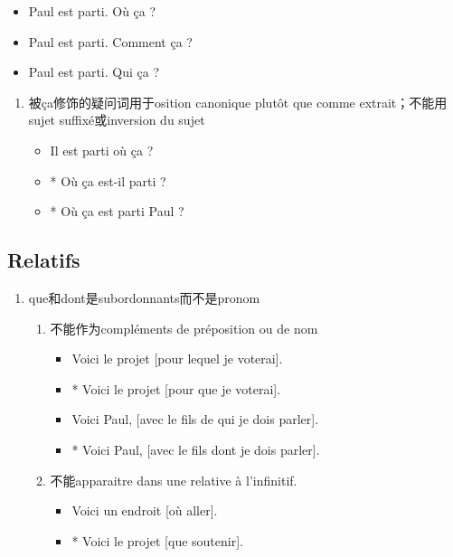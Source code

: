 \documentclass[UTF8]{report}
\begin{document}
\begin{enumerate}
    \begin{itemize}
        \item Paul est parti. Où ça ?
        \item Paul est parti. Comment ça ?
        \item Paul est parti. Qui ça ?
    \end{itemize}
    \begin{enumerate}
        \item 被ça修饰的疑问词用于osition canonique plutôt que comme extrait；不能用sujet suffixé或inversion du sujet
        \begin{itemize}
            \item Il est parti où ça ?
            \item * Où ça est-il parti ?
            \item * Où ça est parti Paul ?
        \end{itemize}
    \end{enumerate}
\end{enumerate}

\subsection{Relatifs}
\begin{enumerate}
    \item que和dont是subordonnants而不是pronom
    \begin{enumerate}
        \item 不能作为compléments de préposition ou de nom
        \begin{itemize}
            \item Voici le projet [pour lequel je voterai].
            \item * Voici le projet [pour que je voterai].
            \item Voici Paul, [avec le fils de qui je dois parler].
            \item * Voici Paul, [avec le fils dont je dois parler].
        \end{itemize}
        \item 不能apparaitre dans une relative à l’infinitif.
        \begin{itemize}
            \item Voici un endroit [où aller].
            \item * Voici le projet [que soutenir].
        \end{itemize}
    \end{enumerate}
\end{enumerate}
\end{document}
